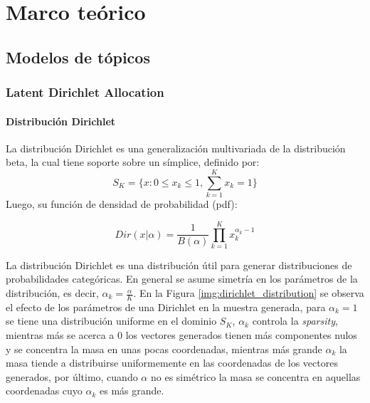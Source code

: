 \documentclass[letterpaper,12pt,oneside]{book} %
\begin{document}
\chapter{Marco teórico}
\section{Modelos de tópicos}
\subsection{Latent Dirichlet Allocation}
\subsubsection{Distribución Dirichlet}
La distribución Dirichlet es una generalización multivariada de la distribución beta, la cual tiene soporte sobre un símplice, definido por:
\begin{equation}
    S_{K} = \{x: 0\leq x_{k} \leq 1, \sum_{k=1}^{K}x_{k}=1\}
\end{equation}
Luego, su función de densidad de probabilidad (pdf):

\begin{equation}
    Dir(x|\alpha)=\frac{1}{B(\alpha)}\prod_{k=1}^{K}x_{k}^{\alpha_{k}-1}
\end{equation}

La distribución Dirichlet es una distribución útil para generar distribuciones de probabilidades categóricas. En general se asume simetría en los parámetros de la distribución, es decir, $\alpha_{k}=\frac{\alpha}{K}$. En la Figura \ref{img:dirichlet_distribution} se observa el efecto de los parámetros de una Dirichlet en la muestra generada, para $\alpha_{k}=1$ se tiene una distribución uniforme en el dominio $S_{K}$, $\alpha_{k}$ controla la \textit{sparsity}, mientras más se acerca a 0 los vectores generados tienen más componentes nulos y se concentra la masa en unas pocas coordenadas, mientras más grande $\alpha_{k}$ la masa tiende a distribuirse uniformemente en las coordenadas de los vectores generados, por último, cuando $\alpha$ no es simétrico la masa se concentra en aquellas coordenadas cuyo $\alpha_{k}$ es más grande.
\end{document}
